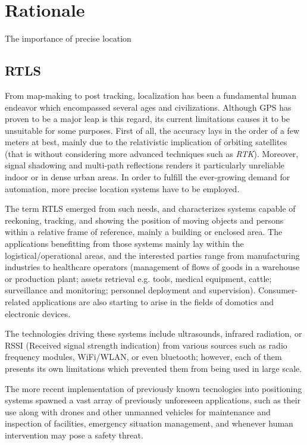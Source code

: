 \section{Rationale}
The importance of precise location 

\subsection{RTLS}

From map-making to post tracking, localization has been a fundamental human endeavor which encompassed several ages and civilizations.
Although GPS has proven to be a major leap is this regard, its current limitations causes it to be unsuitable for some purposes.
First of all, the accuracy lays in the order of a few meters at best, mainly due to the relativistic implication of orbiting satellites \cite{gps1} (that is without considering more advanced techniques such as \emph{RTK}).
Moreover, signal shadowing and multi-path reflections renders it particularly unreliable indoor or in dense urban areas.
In order to fulfill the ever-growing demand for automation, more precise location systems have to be employed.

The term RTLS emerged from such needs, and characterizes systems capable of reckoning, tracking, and showing the position of moving objects and persons within a relative frame of reference, mainly a building or enclosed area.
The applications benefitting from those systems mainly lay within the logistical/operational areas, and the interested parties range from manufacturing industries to healthcare operators (management of flows of goods in a warehouse or production plant; assets retrieval e.g. tools, medical equipment, cattle; surveillance and monitoring; personnel deployment and supervision).
Consumer-related applications are also starting to arise in the fields of domotics and electronic devices.

The technologies driving these systems include ultrasounds, infrared radiation, or RSSI (Received signal strength indication) from various sources such as radio frequency modules, WiFi/WLAN, or even bluetooth; however, each of them presents its own limitations which prevented them from being used in large scale. \cite{joost}

The more recent implementation of previously known tecnologies into positioning systems spawned a vast array of previously unforeseen applications, such as their use along with drones and other unmanned vehicles for maintenance and inspection of facilities, emergency situation management, and whenever human intervention may pose a safety threat.


